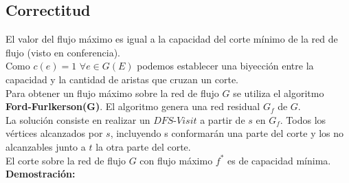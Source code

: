 \documentclass[a4paper,10pt]{article}
\begin{document}
	\subsection{Correctitud}
	El valor del flujo m\'aximo es igual a la capacidad del corte m\'inimo de la red de flujo (visto en conferencia).
	\\Como $c(e)=1$ $\forall e \in G(E)$ podemos establecer una biyecci\'on entre la capacidad y la cantidad de aristas que cruzan un corte.  
	\\Para obtener un flujo m\'aximo sobre la red de flujo $G$ se utiliza el algoritmo {\bf Ford-Furlkerson(G)}. El algoritmo genera una red residual $G_f$ de $G$.
	\\La soluci\'on consiste en realizar un $DFS$-$Visit$ a partir de $s$ en  $G_f$. Todos los v\'ertices alcanzados por $s$, incluyendo s conformar\'an una parte del corte y los no alcanzables junto a $t$ la otra parte del corte.
	\\El corte sobre la red de flujo $G$ con flujo m\'aximo $f^*$ es de capacidad m\'inima.
	\textbf{Demostraci\'on:}
\end{document}
